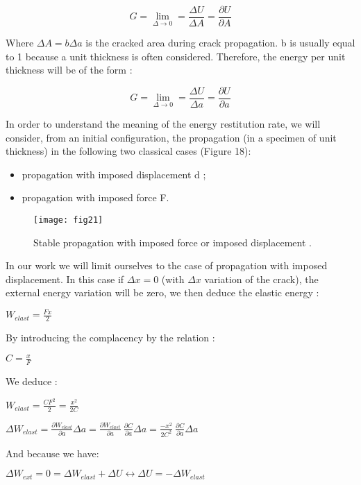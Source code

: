 \begin{equation}
	G = \lim_{\Delta \to 0}= \frac{\Delta U}{\Delta A}= \frac{\partial U}{\partial A}
\end{equation}

Where $\Delta A=b\Delta a$  is the cracked area during crack propagation. b is usually equal to 1 because a unit thickness is often considered. Therefore, the energy per unit thickness will be of the form :

\begin{equation}
	G = \lim_{\Delta \to 0}= \frac{\Delta U}{\Delta a}= \frac{\partial U}{\partial a}
\end{equation}

In order to understand the meaning of the energy restitution rate, we will consider, from an initial configuration, the propagation (in a specimen of unit thickness) in the following two classical cases (Figure 18):

\begin{itemize}
	\item propagation with imposed displacement d ; 
	\item propagation with imposed force F.
\end{itemize}

\begin{figure}[htp]
	\centering
	\texttt{[image: fig21]}
	\caption{Stable propagation with imposed force or imposed displacement \cite{Reference7}.}
	\label{fig:fig21}
\end{figure}

In our work we will limit ourselves to the case of propagation with imposed displacement. In this case if $\Delta x=0$ (with $\Delta x$ variation of the crack), the external energy variation will be zero, we then deduce the elastic energy :

$W_{elast}=\frac{Fx}{2}$

By introducing the complacency by the relation :

$C=\frac{x}{F}$

We deduce :

$W_{elast}=\frac{CF^2}{2}=\frac{x^2}{2C}$

$\Delta W_{elast}=\frac{\partial W_{elast}}{\partial a}\Delta a=\frac{\partial W_{elast}}{\partial a}\ \frac{\partial C}{\partial a}\Delta a=\frac{-x^2}{2C^2}\ \frac{\partial C}{\partial a}\Delta a$

And because we have:

$\Delta W_{ext}=0=\Delta W_{elast}+\Delta U\leftrightarrow \Delta U =-\Delta W_{elast}$

